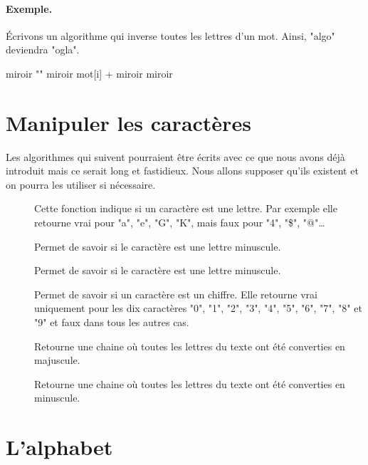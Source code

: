 	\paragraph{Exemple.}
	Écrivons un algorithme qui inverse toutes les lettres d’un mot.
	Ainsi, "algo" deviendra "ogla".
	\begin{LDA}
			\Let miroir \Gets ""
				\Let miroir \Gets mot[i] + miroir
			\EndFor
			\Return miroir
		\EndAlgo
	\end{LDA}
	
\section{Manipuler les caractères}

	Les algorithmes qui suivent pourraient être écrits
	avec ce que nous avons déjà introduit mais ce serait long
	et fastidieux. 
	Nous allons supposer qu’ils existent et on pourra les utiliser
	si nécessaire.
	
	\begin{description}
	\item[]
		Cette fonction indique si un caractère est une lettre. 
		Par exemple elle retourne vrai pour "a", "e", "G", "K", 
		mais faux pour "4", "\$", "@"\dots %
	\item[]	
		Permet de savoir si le caractère est une lettre minuscule.
	\item[]	
		Permet de savoir si le caractère est une lettre minuscule.
	\item[]	
		Permet de savoir si un caractère est un chiffre. 
		Elle retourne vrai uniquement pour les dix caractères 
		"0", "1", "2", "3", "4", "5", "6", "7", "8" et "9" 
		et faux dans tous les autres cas.
	\item[]
		Retourne une chaine où toutes les lettres du texte
		ont été converties en majuscule.
	\item[]
		Retourne une chaine où toutes les lettres du texte
		ont été converties en minuscule.
	\end{description}
	
\section{L’alphabet}

